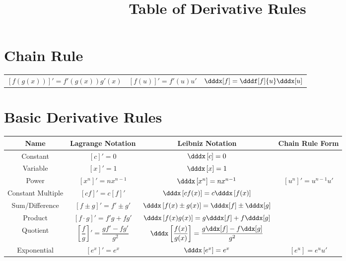 \documentclass{siproblemset}
\title{Table of Derivative Rules}
\begin{document}
    \maketitle
    \setcounter{section}{-1}
    \section{Chain Rule}
    \begin{tabular}{c c c}
        $\left[f(g(x))\right]'=f'(g(x))g'(x)$ \hspace{2cm} & 
        $\left[f(u)\right]'=f'(u)u'$ \hspace{2cm}  &
        $\dddx[f]=\dddf[f]{u}\dddx[u]$ \hspace{2cm} 
    \end{tabular}
    
    \section{Basic Derivative Rules}
    \begin{tabular}{|c c c c|}
        \hline
        Name & Lagrange Notation & Leibniz Notation & Chain Rule Form \\
        \hline
        Constant & $[c]'=0$ & $\dddx\left[c\right]=0$ &\\
        \hline
        Variable & $[x]'=1$ & $\dddx\left[x\right]=1$ &\\
        Power & $[x^n]'=nx^{n-1}$ & $\dddx\left[x^n\right]=nx^{n-1}$ & $[u^n]'=u^{n-1}u'$ \\
        \hline
        Constant Multiple & $[cf]'=c[f]'$ & $\dddx\left[cf(x)\right]=c\dddx\left[f(x)\right]$ &\\
        \hline
        Sum/Difference & $[f\pm g]'=f'\pm g'$ & $\dddx\left[f(x)\pm g(x)\right]=\dddx[f]\pm\dddx[g]$ &\\
        \hline
        Product & $[f\cdot g]'=f'g+fg'$ & $\dddx\left[f(x)g(x)\right]=g\dddx[f]+f\dddx[g]$ &\\
        \hline
        Quotient & $\left[\dfrac fg\right]'=\dfrac{gf'-fg'}{g^2}$ & $\dddx\left[\dfrac {f(x)}{g(x)}\right]=\dfrac{g\ddx[f]-f\ddx[g]}{g^2}$ &\\
        \hline
        Exponential & $\left[e^x\right]'=e^x$ & $\dddx\left[e^x\right]=e^x$ & $\left[e^u\right]=e^uu'$ \\
        \hline
    \end{tabular}
\end{document}
